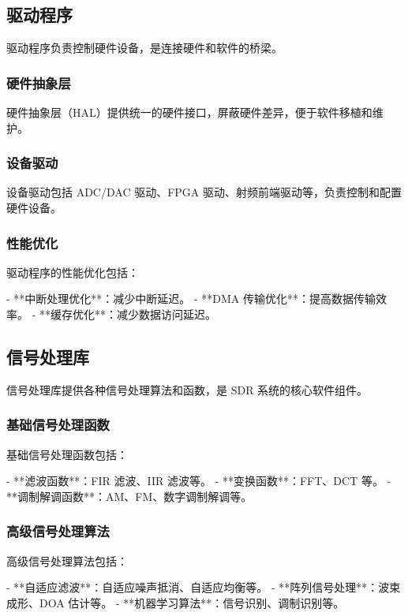 \documentclass[UTF8]{ctexbook}
\begin{document}
\subsection{驱动程序}

驱动程序负责控制硬件设备，是连接硬件和软件的桥梁。

\subsubsection{硬件抽象层}

硬件抽象层（HAL）提供统一的硬件接口，屏蔽硬件差异，便于软件移植和维护。

\subsubsection{设备驱动}

设备驱动包括 ADC/DAC 驱动、FPGA 驱动、射频前端驱动等，负责控制和配置硬件设备。

\subsubsection{性能优化}

驱动程序的性能优化包括：

- **中断处理优化**：减少中断延迟。
- **DMA 传输优化**：提高数据传输效率。
- **缓存优化**：减少数据访问延迟。

\subsection{信号处理库}

信号处理库提供各种信号处理算法和函数，是 SDR 系统的核心软件组件。

\subsubsection{基础信号处理函数}

基础信号处理函数包括：

- **滤波函数**：FIR 滤波、IIR 滤波等。
- **变换函数**：FFT、DCT 等。
- **调制解调函数**：AM、FM、数字调制解调等。

\subsubsection{高级信号处理算法}

高级信号处理算法包括：

- **自适应滤波**：自适应噪声抵消、自适应均衡等。
- **阵列信号处理**：波束成形、DOA 估计等。
- **机器学习算法**：信号识别、调制识别等。
\end{document}
